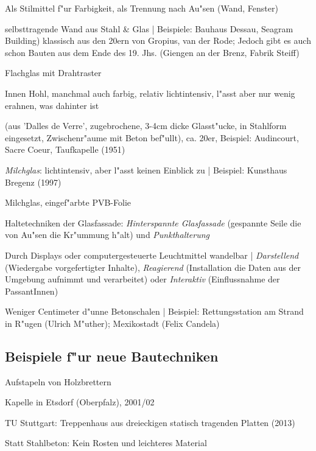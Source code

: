 \documentclass[emulatestandardclasses]{scrartcl}
\begin{document}
\begin{description}[leftmargin=!,labelwidth=\widthof{\bfseries Transluzentes G.}]
  \item[Glas] Als Stilmittel f"ur Farbigkeit, als Trennung nach Au"sen (Wand, Fenster)
  \item[Curtain Wall] selbsttragende Wand aus Stahl \& Glas | Beispiele: Bauhaus Dessau, Seagram Building) klassisch aus den 20ern von Gropius, van der Rode; Jedoch gibt es auch schon Bauten aus dem Ende des 19. Jhs. (Giengen an der Brenz, Fabrik Steiff)
  \item[Drahtglas] Flachglas mit Drahtraster
  \item[Glasbausteine] Innen Hohl, manchmal auch farbig, relativ lichtintensiv, l"asst aber nur wenig erahnen, was dahinter ist
  \item[Betonglas](aus 'Dalles de Verre', zugebrochene, 3-4cm dicke Glasst"ucke, in Stahlform eingesetzt, Zwischenr"aume mit Beton bef"ullt), ca. 20er, Beispiel: Audincourt, Sacre Coeur, Taufkapelle (1951) 
  \item[Opakes Glas] \emph{Milchglas}: lichtintensiv, aber l"asst keinen Einblick zu |  Beispiel: Kunsthaus Bregenz (1997)
  \item[Transluzentes G.] Milchglas, eingef"arbte PVB-Folie
  \item[Glasfassade] Haltetechniken der Glasfassade: \emph{Hinterspannte Glasfassade} (gespannte Seile die von Au"sen die Kr"ummung h"alt) und \emph{Punkthalterung}
  \item[Medienfassade] Durch Displays oder computergesteuerte Leuchtmittel wandelbar | \emph{Darstellend} (Wiedergabe vorgefertigter Inhalte), \emph{Reagierend} (Installation die Daten aus der Umgebung aufnimmt und verarbeitet) oder \emph{Interaktiv} (Einflussnahme der PassantInnen)
  \item[Betonschalen-Konstruktionen] Weniger Centimeter d"unne Betonschalen | Beispiel: Rettungsstation am Strand in R"ugen (Ulrich M"uther); Mexikostadt (Felix Candela)
\end{description}

\subsection{Beispiele f"ur neue Bautechniken}

\begin{description}[leftmargin=!,labelwidth=\widthof{\bfseries Blockbauweisei}]
  \item[Blockbauweise] Aufstapeln von Holzbrettern
  \item[Asphalt] Kapelle in Etsdorf (Oberpfalz), 2001/02
  \item[Biokunststoff] TU Stuttgart: Treppenhaus aus dreieckigen statisch tragenden Platten (2013)
  \item[Carbonbeton] Statt Stahlbeton: Kein Rosten und leichteres Material
\end{description}
\end{document}
